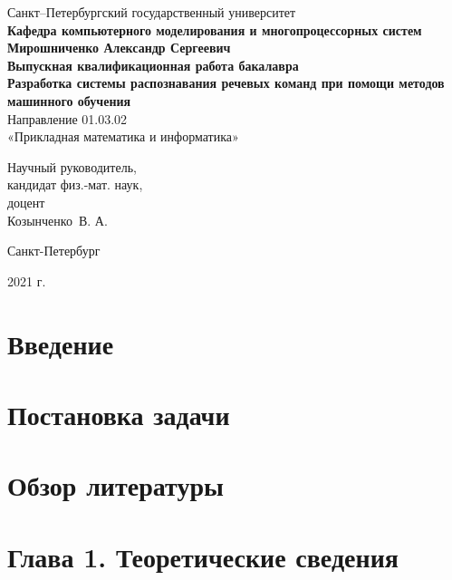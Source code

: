 \documentclass[14pt]{article}
\begin{document}
\begin{titlepage}
\begin{center}
Санкт--Петербургский государственный университет \\
\textbf{Кафедра компьютерного моделирования и многопроцессорных систем}
\vspace{55mm} \\
\textbf{\large Мирошниченко Александр Сергеевич} \\[10mm]
\textbf{\large Выпускная квалификационная работа бакалавра} \\[10mm]
\textbf{\large Разработка системы распознавания речевых команд при помощи методов машинного обучения} \\
Направление 01.03.02 \\
«Прикладная математика и информатика»\\[30mm]
\begin{flushright}
{Научный руководитель,} \\
кандидат физ.-мат. наук, \\доцент \\Козынченко~В. А. 
\end{flushright}
\vfill 
{Санкт-Петербург}
\par{2021 г.}
\end{center}
\end{titlepage}
\addtocounter{page}{1}

\tableofcontents
\newpage

\section*{Введение}


\section*{Постановка задачи}

\section*{Обзор литературы}

\section*{Глава 1. Теоретические сведения}
\end{document}
